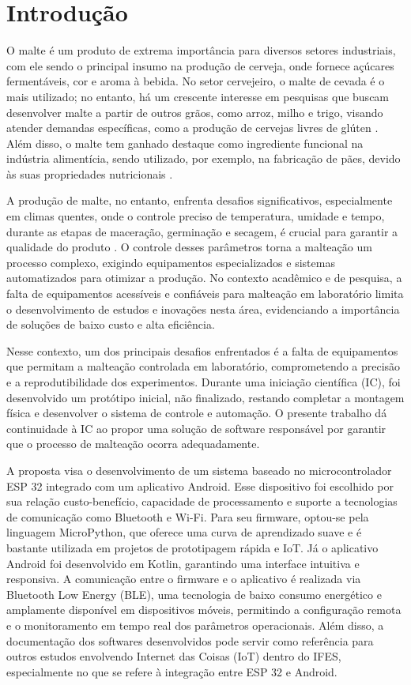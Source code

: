 \chapter[Introdução]{Introdução}

O malte é um produto de extrema importância para diversos setores industriais, com ele sendo o principal insumo na produção de cerveja, onde fornece açúcares fermentáveis, cor e aroma à bebida. No setor cervejeiro, o malte de cevada é o mais utilizado; no entanto, há um crescente interesse em pesquisas que buscam desenvolver malte a partir de outros grãos, como arroz, milho e trigo, visando atender demandas específicas, como a produção de cervejas livres de glúten \cite{CECCARONI2019}. Além disso, o malte tem ganhado destaque como ingrediente funcional na indústria alimentícia, sendo utilizado, por exemplo, na fabricação de pães, devido às suas propriedades nutricionais \cite{KOISTINEN2020}.

A produção de malte, no entanto, enfrenta desafios significativos, especialmente em climas quentes, onde o controle preciso de temperatura, umidade e tempo, durante as etapas de maceração, germinação e secagem, é crucial para garantir a qualidade do produto \cite{KOVALOVA2024}. O controle desses parâmetros torna a malteação um processo complexo, exigindo equipamentos especializados e sistemas automatizados para otimizar a produção. No contexto acadêmico e de pesquisa, a falta de equipamentos acessíveis e confiáveis para malteação em laboratório limita o desenvolvimento de estudos e inovações nesta área, evidenciando a importância de soluções de baixo custo e alta eficiência.

Nesse contexto, um dos principais desafios enfrentados é a falta de equipamentos que permitam a malteação controlada em laboratório, comprometendo a precisão e a reprodutibilidade dos experimentos. Durante uma iniciação científica (IC), foi desenvolvido um protótipo inicial, não finalizado, restando completar a montagem física e desenvolver o sistema de controle e automação. O presente trabalho dá continuidade à IC ao propor uma solução de software responsável por garantir que o processo de malteação ocorra adequadamente.

A proposta visa o desenvolvimento de um sistema baseado no microcontrolador ESP 32 integrado com um aplicativo Android. Esse dispositivo foi escolhido por sua relação custo-benefício, capacidade de processamento e suporte a tecnologias de comunicação como Bluetooth e Wi-Fi. Para seu firmware, optou-se pela linguagem MicroPython, que oferece uma curva de aprendizado suave e é bastante utilizada em projetos de prototipagem rápida e IoT. Já o aplicativo Android foi desenvolvido em Kotlin, garantindo uma interface intuitiva e responsiva. A comunicação entre o firmware e o aplicativo é realizada via Bluetooth Low Energy (BLE), uma tecnologia de baixo consumo energético e amplamente disponível em dispositivos móveis, permitindo a configuração remota e o monitoramento em tempo real dos parâmetros operacionais. Além disso, a documentação dos softwares desenvolvidos pode servir como referência para outros estudos envolvendo Internet das Coisas (IoT) dentro do IFES, especialmente no que se refere à integração entre ESP 32 e Android.

